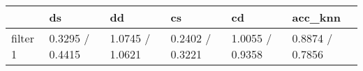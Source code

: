 \begin{tabular}{llllll}
\toprule
{} &               ds &               dd &               cs &               cd &          acc\_knn \\
\midrule
filter 1 &  0.3295 / 0.4415 &  1.0745 / 1.0621 &  0.2402 / 0.3221 &  1.0055 / 0.9358 &  0.8874 / 0.7856 \\
\bottomrule
\end{tabular}
